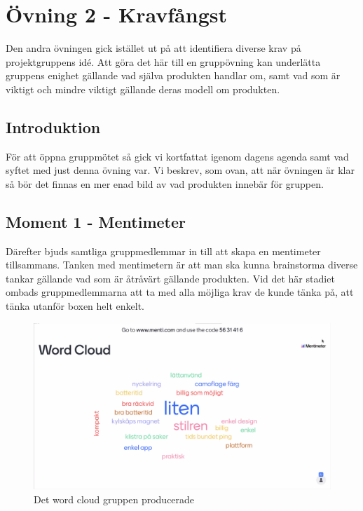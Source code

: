 \documentclass[a4paper, titlepage,12pt]{article}
\begin{document}
	\section{Övning 2 - Kravfångst}
		Den andra övningen gick istället ut på att identifiera diverse krav på projektgruppens idé. Att göra det här till en gruppövning kan underlätta gruppens enighet gällande vad själva produkten handlar om, samt vad som är viktigt och mindre viktigt gällande deras modell om produkten.

		\subsection{Introduktion}
			För att öppna gruppmötet så gick vi kortfattat igenom dagens agenda samt vad syftet med just denna övning var. Vi beskrev, som ovan, att när övningen är klar så bör det finnas en mer enad bild av vad produkten innebär för gruppen. 

		\subsection{Moment 1 - Mentimeter}
			Därefter bjuds samtliga gruppmedlemmar in till att skapa en mentimeter tillsammans. Tanken med mentimetern är att man ska kunna brainstorma diverse tankar gällande vad som är åtråvärt gällande produkten. Vid det här stadiet ombads gruppmedlemmarna att ta med alla möjliga krav de kunde tänka på, att tänka utanför boxen helt enkelt.

			\begin{figure}[!h]
				\begin{center}
				\includegraphics[scale=0.3]{./mentimeter.png}
				\caption{Det word cloud gruppen producerade}
				\end{center}
			\end{figure}
\end{document}
